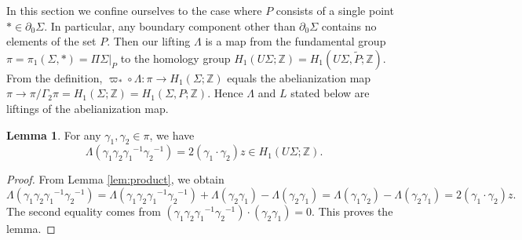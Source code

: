 \documentclass[a4paper,12pt, twoside]{amsart}
\theoremstyle{definition}
\newtheorem{lem}[dfn]{Lemma}
\theoremstyle{remark}
\numberwithin{equation}{section}
\newcommand\bZ{{\mathbb{Z}}}
\newcommand\inv{^{-1}}
\newcommand\La{\Lambda}
\newcommand\pa{\partial}
\begin{document}
In this section we confine ourselves to the case where $P$ consists of a single point $\ast \in \pa_0\Sigma$. In particular, any boundary component other than $\pa_0\Sigma$ contains no elements of the set $P$. 
Then our lifting $\La$ is a map from the fundamental group $\pi = \pi_1(\Sigma, \ast) = \Pi\Sigma\vert_P$ to the homology group $H_1(U\Sigma; \bZ) = H_1(U\Sigma, \tilde P; \bZ)$. From the definition, $\varpi_*\circ \La: \pi \to H_1(\Sigma; \bZ)$ equals the abelianization map $\pi \to \pi/\Gamma_2\pi = H_1(\Sigma; \bZ) = H_1(\Sigma, P; \bZ)$. Hence $\La$ and $L$ stated below are liftings of the abelianization map. \par
\begin{lem}\label{lem:commutator} For any $\gamma_1, \gamma_2 \in \pi$, we have
$$
\La(\gamma_1\gamma_2{\gamma_1}\inv{\gamma_2}\inv)
= 2(\gamma_1\cdot\gamma_2)z \in H_1(U\Sigma; \bZ).
$$
\end{lem}
\begin{proof}
From Lemma \ref{lem:product}, 
we obtain 
$$
\La(\gamma_1\gamma_2{\gamma_1}\inv{\gamma_2}\inv)
= \La(\gamma_1\gamma_2{\gamma_1}\inv{\gamma_2}\inv) +\La(\gamma_2\gamma_1)- \La(\gamma_2\gamma_1)
= \La(\gamma_1\gamma_2) - \La(\gamma_2\gamma_1) = 2(\gamma_1\cdot\gamma_2)z.
$$
The second equality comes from $(\gamma_1\gamma_2{\gamma_1}\inv{\gamma_2}\inv)\cdot(\gamma_2\gamma_1) = 0$. This proves the lemma.
\end{proof}
\end{document}
